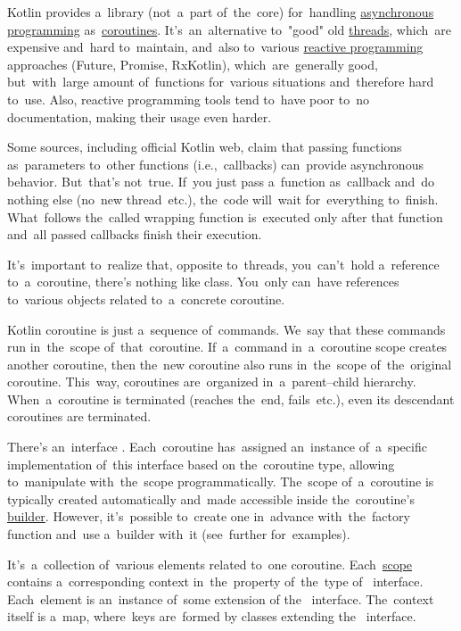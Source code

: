 \label{kotlincoroutine}
Kotlin provides a~library (not~a~part of~the~core) for~handling \hyperref[concurrentparallelasynchronous]{asynchronous programming} as~\hyperref[coroutines]{coroutines}.
It's~an~alternative to~"good" old \hyperref[coroutines]{threads}, which~are expensive and~hard to~maintain, and~also to~various \hyperref[reactiveprogramming]{reactive programming} approaches (Future, Promise, RxKotlin), which~are~generally good, but~with~large amount of~functions for~various situations and~therefore hard to~use.
Also, reactive programming tools tend to~have poor to~no documentation, making their usage even harder.

\warning Some sources, including official Kotlin web, claim that passing functions as~parameters to~other functions (i.e.,~callbacks) can~provide asynchronous behavior.
But~that's not~true.
If~you just pass a~function as~callback and~do nothing else \mbox{(no new} \mbox{thread etc.)}, the~code will~wait for~everything to~finish.
What~follows the~called wrapping function is~executed only after that function and~all passed callbacks finish their execution.

\warning It's~important to~realize that, opposite to~threads, you~can't~hold a~reference to~a~coroutine, there's nothing like  class.
You~only can~have references to~various objects related to~a~concrete coroutine.

\label{kotlincoroutinescope}
Kotlin coroutine is just a~sequence of~commands.
We~say that these commands run in~the~scope of~that~coroutine.
If~a~command in~a~coroutine scope creates another coroutine, then the~new coroutine also runs in~the~scope of~the~original coroutine.
This~way, coroutines are~organized in~a~parent--child hierarchy.
When~a~coroutine is terminated (reaches the~end, fails~etc.), even its descendant coroutines are terminated.

There's an~interface .
Each~coroutine has~assigned an~instance of~a~specific implementation of~this interface based on the~coroutine type, allowing to~manipulate with~the~scope programmatically.
The~scope of~a~coroutine is typically created automatically and~made accessible inside the~coroutine's \hyperref[kotlincoroutinebuilder]{builder}.
However, it's~possible to~create one in~advance with~the~factory function  and~use a~builder with~it (see~further for~examples).

\label{kotlincoroutinecontext}
It's~a~collection of~various elements related to~one coroutine.
Each~\hyperref[kotlincoroutinescope]{scope} contains a~corresponding context in~the~property  of~the~type of~ interface.
Each~element is an~instance of~some extension of the~ interface.
The~context itself is a~map, where~keys are~formed by classes extending the~ interface.

